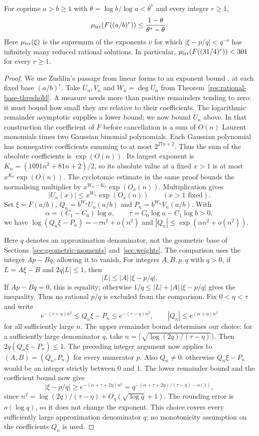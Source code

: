 \documentclass[11pt]{article}
\begin{document}
\begin{corollary}
\label{cor:rational-base-measure}
For coprime $a>b\ge1$ with $\theta=\log b/\log a<\theta^*$ and every
integer $r\ge1$,
\[
 \mu_{\rm irr}\!\left(F((a/b)^r)\right)
 \le\frac{1-\theta}{\theta^*-\theta}.
\]
Here $\mu_{\rm irr}(\xi)$ is the supremum of the exponents $\nu$ for which
$|\xi-p/q|<q^{-\nu}$ has infinitely many reduced rational solutions.
In particular, $\mu_{\rm irr}(F((31/4)^r))<301$ for every $r\ge1$.
\end{corollary}
\begin{proof}
We use Zudilin's passage from linear forms to an exponent bound
\cite[p.~162]{zudilin2004}, at each fixed base $(a/b)^r$.
Take $U_n,V_n$ and $W_n=\deg U_n$ from
Theorem~\ref{res:rational-base-threshold}. A measure needs more
than positive remainders tending to zero: it must bound how small
they are relative to their coefficients. The logarithmic remainder
asymptotic supplies a lower bound; we now bound $U_n$ above.
In that construction the coefficient of $F$ before cancellation is a
sum of $O(n)$ Laurent monomials times two Gaussian binomial polynomials.
Each Gaussian polynomial has nonnegative coefficients summing to at
most $2^{27n+2}$. Thus the sum of the absolute coefficients is
$\exp(O(n))$. Its largest exponent is
$K_n=(1091n^2+81n+2)/2$, so its absolute value at a fixed $x>1$ is at
most $x^{K_n}\exp(O(n))$. The cyclotomic estimate in the same proof
bounds the normalising multiplier by
$x^{W_n-K_n}\exp(O_x(n))$. Multiplication gives
\[
 |U_n(x)|\le x^{W_n}\exp(O_x(n))\qquad(x>1\text{ fixed}).
\]
Set $\xi=F(a/b)$, $Q_n=b^{W_n}U_n(a/b)$ and
$P_n=b^{W_n}V_n(a/b)$.  With
\[
 \alpha=(C_1-C_0)\log a,\qquad
 \tau=C_0\log a-C_1\log b>0,
\]
we have $\log(Q_n\xi-P_n)=-\tau n^2+o(n^2)$ and
$|Q_n|\le\exp(\alpha n^2+o(n^2))$.

Here $q$ denotes an approximation denominator, not the geometric
base of Sections~\ref{sec:geometric-moments} and~\ref{sec:weights}.
The comparison uses the integer $Ap-Bq$, allowing it to vanish.
For integers $A,B,p,q$ with $q>0$, if $L=A\xi-B$ and $2q|L|\le1$, then
\[
 |L|\le |A|\,|\xi-p/q|.
\]
If $Ap-Bq=0$, this is equality; otherwise
$1/q\le |L|+|A|\,|\xi-p/q|$ gives the inequality. Thus no rational
$p/q$ is excluded from the comparison. Fix $0<\eta<\tau$ and write
\[
 e^{-(\tau+\eta)n^2}\le Q_n\xi-P_n\le e^{-(\tau-\eta)n^2},
 \qquad |Q_n|\le e^{(\alpha+\eta)n^2}
\]
for all sufficiently large $n$. The upper remainder bound determines
our choice: for a sufficiently large denominator $q$, take
$n=\lceil\sqrt{\log(2q)/(\tau-\eta)}\rceil$. Then
$2q(Q_n\xi-P_n)\le1$. The preceding integer argument now applies to
$(A,B)=(Q_n,P_n)$ for every numerator $p$. Also $Q_n\ne0$: otherwise
$Q_n\xi-P_n$ would be an integer strictly between $0$ and $1$.
The lower remainder bound and the coefficient bound now give
\[
 |\xi-p/q|\ge e^{-(\alpha+\tau+2\eta)n^2}
             =q^{-(\alpha+\tau+2\eta)/(\tau-\eta)-o(1)},
\]
since $n^2=\log(2q)/(\tau-\eta)+O_\eta(\sqrt{\log q}+1)$.
The rounding error is $o(\log q)$, so it does not change the exponent.
This choice covers every sufficiently large approximation denominator
$q$; no monotonicity assumption on the coefficients $Q_n$ is used.


\end{proof}
\end{document}
